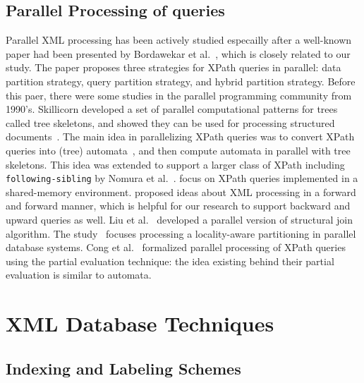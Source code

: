 \subsection{Parallel Processing of queries}

Parallel XML processing has been actively studied especailly after a well-known
paper had been presented by Bordawekar et al.~\cite{BoLS09}, which is closely
related to our study. The paper proposes three strategies for XPath queries in
parallel: data partition strategy, query partition strategy, and hybrid
partition strategy. Before this paer, there were some studies in the parallel
programming community from 1990's. Skillicorn developed a set of parallel
computational patterns for trees called tree skeletons, and showed they can be
used for processing structured documents~\cite{Skil97}. The main idea in
parallelizing XPath queries was to convert XPath queries into (tree)
automata~\cite{comon2007tree}, and then compute automata in parallel with tree
skeletons. This idea was extended to support a larger class of XPath including
\texttt{following-sibling} by Nomura et al.~\cite{NEMH07}.
\cite{KrYa10,PLZC07,ZhPC10} focus on XPath queries implemented in a
shared-memory environment. \cite{AAHa11} proposed ideas about XML processing in
a forward and forward manner, which is helpful for our research to support
backward and upward queries as well. Liu et al.~\cite{LFLQ08} developed a
parallel version of structural join algorithm. The study~\cite{ZaBS15} focuses
processing a locality-aware partitioning in parallel database systems. Cong et
al.~\cite{CFKL12} formalized parallel processing of XPath queries using the
partial evaluation technique: the idea existing behind their partial evaluation
is similar to automata.

\section{XML Database Techniques}

\subsection{Indexing and Labeling Schemes}

